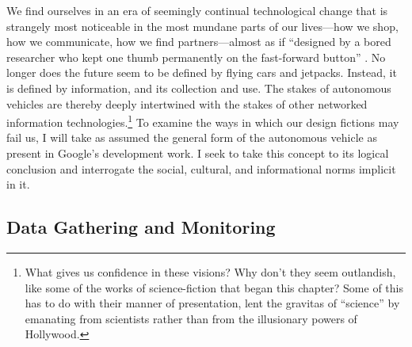 We find ourselves in an era of seemingly continual technological
change that is strangely most noticeable in the most mundane parts of
our lives---how we shop, how we communicate, how we find
partners---almost as if ``designed by a bored researcher who kept one
thumb permanently on the fast-forward button'' \cite[p.
  7]{Neuromancer1984}. No longer does the future seem to be
defined by flying cars and jetpacks. Instead, it is defined by
information, and its collection and use. The stakes of autonomous
vehicles are thereby deeply intertwined with the
stakes of other networked information technologies.\footnote{What gives us confidence in
these visions? Why don't they seem 
outlandish, like some of the works of science-fiction that began this
chapter? Some of this has to do with their manner of 
presentation, lent the gravitas of ``science'' by emanating from
scientists rather than from the
illusionary powers of Hollywood.} To examine the
ways in which our design fictions may fail us, I will
take as assumed the general form of the autonomous vehicle as present
in Google's development work. I seek to take this concept
to its logical conclusion and interrogate the social,
cultural, and informational norms implicit in it. 


\subsection{Data Gathering and Monitoring} 



